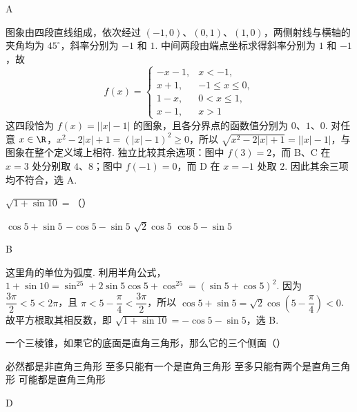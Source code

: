 \begin{answer}
A
\end{answer}

\begin{solution}
图象由四段直线组成，依次经过 \((-1,0)\)、\((0,1)\)、\((1,0)\)，两侧射线与横轴的夹角均为 \(45^\circ\)，斜率分别为 \(-1\) 和 \(1\). 中间两段由端点坐标求得斜率分别为 \(1\) 和 \(-1\)，故
\[
f(x)=\begin{cases}
-x-1, & x<-1,\\
x+1, & -1\le x\le0,\\
1-x, & 0<x\le1,\\
x-1, & x>1
\end{cases}
\]
这四段恰为 \(f(x)=\left||x|-1\right|\) 的图象，且各分界点的函数值分别为 \(0\)、\(1\)、\(0\). 对任意 \(x\in\R\)，\(x^2-2|x|+1=(|x|-1)^2\ge0\)，所以 \(\sqrt{x^2-2|x|+1}=\left||x|-1\right|\)，与图象在整个定义域上相符. 独立比较其余选项：图中 \(f(3)=2\)，而 B、C 在 \(x=3\) 处分别取 \(4\)、\(8\)；图中 \(f(-1)=0\)，而 D 在 \(x=-1\) 处取 \(2\). 因此其余三项均不符合，选 A.
\end{solution}

\begin{problem}
\(\sqrt{1 + \sin 10}=\)（\quad）

\choices
    {\(\cos 5 + \sin 5\)}
    {\(-\cos 5 - \sin 5\)}
    {\(\sqrt{2}\cos 5\)}
    {\(\cos 5 - \sin 5\)}
\end{problem}

\begin{answer}
B
\end{answer}

\begin{solution}
这里角的单位为弧度. 利用半角公式，\(1+\sin10=\sin^25+2\sin5\cos5+\cos^25=(\sin5+\cos5)^2\). 因为 \(\dfrac{3\pi}{2}<5<2\pi\)，且 \(\pi<5-\dfrac\pi4<\dfrac{3\pi}{2}\)，所以 \(\cos5+\sin5=\sqrt2\cos\left(5-\dfrac\pi4\right)<0\). 故平方根取其相反数，即 \(\sqrt{1+\sin10}=-\cos5-\sin5\)，选 B.
\end{solution}

\begin{problem}
一个三棱锥，如果它的底面是直角三角形，那么它的三个侧面（\quad）

\choices
    {必然都是非直角三角形}
    {至多只能有一个是直角三角形}
    {至多只能有两个是直角三角形}
    {可能都是直角三角形}
\end{problem}

\begin{answer}
D
\end{answer}

